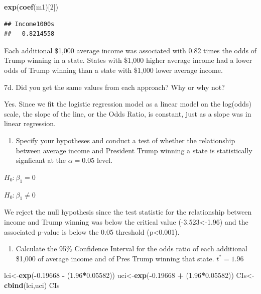 \documentclass[]{article}
\newenvironment{Shaded}{\begin{snugshade}}{\end{snugshade}}
\newcommand{\DecValTok}[1]{\textcolor[rgb]{0.00,0.00,0.81}{#1}}
\newcommand{\FloatTok}[1]{\textcolor[rgb]{0.00,0.00,0.81}{#1}}
\newcommand{\KeywordTok}[1]{\textcolor[rgb]{0.13,0.29,0.53}{\textbf{#1}}}
\newcommand{\NormalTok}[1]{#1}
\newcommand{\OperatorTok}[1]{\textcolor[rgb]{0.81,0.36,0.00}{\textbf{#1}}}
\newcommand{\StringTok}[1]{\textcolor[rgb]{0.31,0.60,0.02}{#1}}
\providecommand{\tightlist}{%
  \setlength{\itemsep}{0pt}\setlength{\parskip}{0pt}}
\begin{document}
\begin{Shaded}
\begin{Highlighting}[]
\KeywordTok{exp}\NormalTok{(}\KeywordTok{coef}\NormalTok{(m1)[}\DecValTok{2}\NormalTok{])}
\end{Highlighting}
\end{Shaded}

\begin{verbatim}
## Income1000s 
##   0.8214558
\end{verbatim}

Each additional \$1,000 average income was associated with 0.82 times
the odds of Trump winning in a state. States with \$1,000 higher average
income had a lower odds of Trump winning than a state with \$1,000 lower
average income.

7d. Did you get the same values from each approach? Why or why not?

Yes. Since we fit the logistic regression model as a linear model on the
log(odds) scale, the slope of the line, or the Odds Ratio, is constant,
just as a slope was in linear regression.

\begin{enumerate}
\def\labelenumi{\arabic{enumi}.}
\setcounter{enumi}{7}
\tightlist
\item
  Specify your hypotheses and conduct a test of whether the relationship
  between average income and President Trump winning a state is
  statistically signficant at the \(\alpha = 0.05\) level.
\end{enumerate}

\(H_0: \beta_1 = 0\)

\(H_0: \beta_1 \ne 0\)

We reject the null hypothesis since the test statistic for the
relationship between income and Trump winning was below the critical
value (-3.523\textless{}-1.96) and the associated p-value is below the
0.05 threshold (p\textless{}0.001).

\begin{enumerate}
\def\labelenumi{\arabic{enumi}.}
\setcounter{enumi}{8}
\tightlist
\item
  Calculate the 95\% Confidence Interval for the odds ratio of each
  additional \$1,000 of average income and of Pres Trump winning that
  state. \(t^* = 1.96\)
\end{enumerate}

\begin{Shaded}
\begin{Highlighting}[]
\NormalTok{lci<-}\KeywordTok{exp}\NormalTok{(}\OperatorTok{-}\FloatTok{0.19668} \OperatorTok{-}\StringTok{ }\NormalTok{(}\FloatTok{1.96}\OperatorTok{*}\FloatTok{0.05582}\NormalTok{))}
\NormalTok{uci<-}\KeywordTok{exp}\NormalTok{(}\OperatorTok{-}\FloatTok{0.19668} \OperatorTok{+}\StringTok{ }\NormalTok{(}\FloatTok{1.96}\OperatorTok{*}\FloatTok{0.05582}\NormalTok{))}
\NormalTok{CIs<-}\KeywordTok{cbind}\NormalTok{(lci,uci)}
\NormalTok{CIs}
\end{Highlighting}
\end{Shaded}
\end{document}
